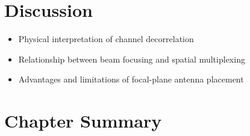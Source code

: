 \section{Discussion}
\begin{itemize}
    \item Physical interpretation of channel decorrelation
    \item Relationship between beam focusing and spatial multiplexing
    \item Advantages and limitations of focal-plane antenna placement
\end{itemize}

\section{Chapter Summary}
